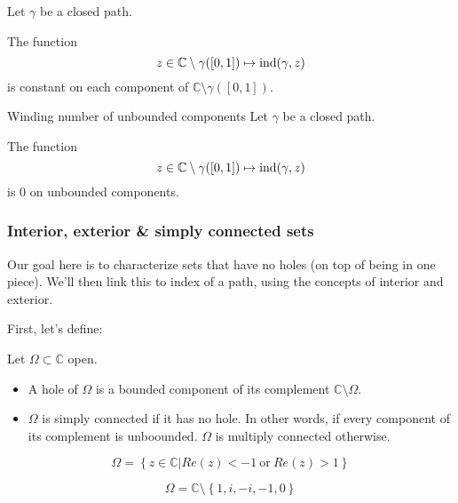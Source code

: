 \begin{thm*}
    Let $\gamma$ be a closed path.

    The function
    $$ z \in \mathbb{C} \setminus \gamma([0,1]) \mapsto \operatorname{ind}(\gamma, z) $$
    is constant on each component of $\mathbb{C}\setminus \gamma([0,1])$.
\end{thm*}

\begin{thm*}{Winding number of unbounded components}
    Let $\gamma$ be a closed path.

    The function
    $$ z \in \mathbb{C} \setminus \gamma([0,1]) \mapsto \operatorname{ind}(\gamma, z) $$
    is $0$ on unbounded components.
\end{thm*}

\subsubsection{Interior, exterior \& simply connected sets}

Our goal here is to characterize sets that have no holes (on top of being in one piece). We'll then link this to index of a path, using the concepts of interior and exterior.

First, let's define:

\begin{defi}
    Let $\Omega\subset\mathbb{C}$ open.

    \begin{itemize}
        \item A hole of $\Omega$ is a bounded component of its complement $\mathbb{C} \setminus \Omega$.
        \item $\Omega$ is simply connected if it has no hole. In other words, if every component of its complement is unboounded. $\Omega$ is multiply connected otherwise.
    \end{itemize}
\end{defi}

\begin{example}
    $$\Omega = \left\lbrace z \in \mathbb{C} \bigg\vert Re(z) < -1 ~\mathrm{or}~ Re(z) > 1 \right\rbrace$$
\end{example}

\begin{example}
    $$\Omega = \mathbb{C} \setminus \left\lbrace 1, i, -i, -1, 0 \right\rbrace$$
\end{example}

